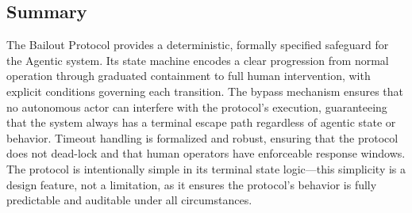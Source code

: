 \subsection{Summary}

The Bailout Protocol provides a deterministic, formally specified safeguard for the Agentic system. Its state machine encodes a clear progression from normal operation through graduated containment to full human intervention, with explicit conditions governing each transition. The bypass mechanism ensures that no autonomous actor can interfere with the protocol's execution, guaranteeing that the system always has a terminal escape path regardless of agentic state or behavior. Timeout handling is formalized and robust, ensuring that the protocol does not dead-lock and that human operators have enforceable response windows. The protocol is intentionally simple in its terminal state logic—this simplicity is a design feature, not a limitation, as it ensures the protocol's behavior is fully predictable and auditable under all circumstances.